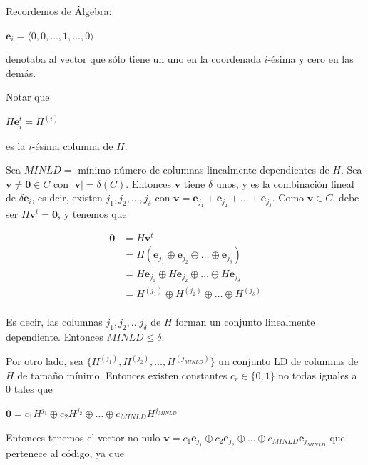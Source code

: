 \documentclass[10pt,a4paper]{article}
\begin{document}
Recordemos de Álgebra:

\begin{center}
$\textbf{e}_i=\langle0, 0,\dots, 1, \dots, 0 \rangle$
\end{center}

denotaba al vector que sólo tiene un uno en la coordenada $i $-ésima y cero en las demás.

Notar que

\begin{center}
$H\textbf{e}_i^t=H^{(i)}$
\end{center}

es la $i$-ésima columna de $H$.

Sea $MINLD = $ mínimo número de columnas linealmente dependientes de $H$. Sea $\textbf{v}\neq \textbf{0}\in C$ con $|\textbf{v}| = \delta(C)$. Entonces $\textbf{v}$ tiene $\delta$ unos, y es la combinación lineal de $\delta \textbf{e}_i$, es dcir, existen $j_1, j_2,\dots, j_\delta$ con $\textbf{v}=\textbf{e}_{j_1}+\textbf{e}_{j_2}+\dots+\textbf{e}_{j_\delta}$. Como $\textbf{v} \in C$, debe ser $H\textbf{v}^t = \textbf{0}$, y tenemos que

\begin{center}
\begin{align*} \textbf{0} &= H\textbf{v}^t\\ &= H\left(\textbf{e}_{j_1}\oplus\textbf{e}_{j_2}\oplus\dots \oplus\textbf{e}_{j_\delta}\right)\\ &= H\textbf{e}_{j_1}\oplus H\textbf{e}_{j_2}\oplus\dots \oplus H\textbf{e}_{j_\delta}\\ &= H^{(j_1)} \oplus H^{(j_2)}\oplus\dots \oplus H^{(j_\delta)} \\ \end{align*}
\end{center}

Es decir, las columnas $j_1, j_2, \dots j_\delta$ de $H$ forman un conjunto linealmente dependiente. Entonces $MINLD \leq \delta$.

Por otro lado, sea $\{H^{(j_1)}, H^{(j_2)},\dots, H^{(j_{MINLD})}\}$ un conjunto LD de columnas de $H$ de tamaño mínimo. Entonces existen constantes $c_r \in \{0, 1\}$ no todas iguales a $0$ tales que

\begin{center}
$\textbf{0} = c_1H^{j_1}\oplus c_2H^{j_2}\oplus \dots \oplus c_{MINLD}H^{j_{MINLD}}$
\end{center}

Entonces tenemos el vector no nulo $\textbf{v} = c_1\textbf{e}_{j_1}\oplus c_2\textbf{e}_{j_2}\oplus\dots \oplus c_{MINLD}\textbf{e}_{j_{MINLD}}$ que pertenece al código, ya que
\end{document}

